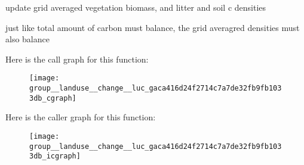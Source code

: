 update grid averaged vegetation biomass, and litter and soil c densities

just like total amount of carbon must balance, the grid averagred densities must also balance

Here is the call graph for this function\+:\nopagebreak
\begin{figure}[H]
\begin{center}
\leavevmode
\texttt{[image: group\_\_landuse\_\_change\_\_luc\_gaca416d24f2714c7a7de32fb9fb1033db\_cgraph]}
\end{center}
\end{figure}




Here is the caller graph for this function\+:\nopagebreak
\begin{figure}[H]
\begin{center}
\leavevmode
\texttt{[image: group\_\_landuse\_\_change\_\_luc\_gaca416d24f2714c7a7de32fb9fb1033db\_icgraph]}
\end{center}
\end{figure}


